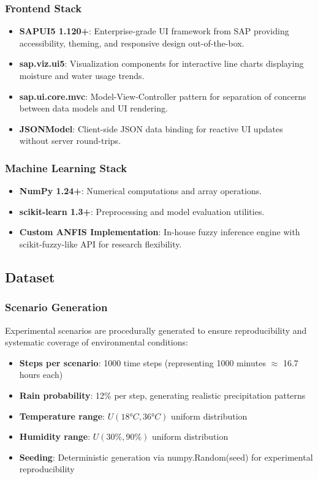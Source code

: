 \subsubsection{Frontend Stack}

\begin{itemize}
    \item \textbf{SAPUI5 1.120+}: Enterprise-grade UI framework from SAP providing accessibility, theming, and responsive design out-of-the-box.
    \item \textbf{sap.viz.ui5}: Visualization components for interactive line charts displaying moisture and water usage trends.
    \item \textbf{sap.ui.core.mvc}: Model-View-Controller pattern for separation of concerns between data models and UI rendering.
    \item \textbf{JSONModel}: Client-side JSON data binding for reactive UI updates without server round-trips.
\end{itemize}

\subsubsection{Machine Learning Stack}

\begin{itemize}
    \item \textbf{NumPy 1.24+}: Numerical computations and array operations.
    \item \textbf{scikit-learn 1.3+}: Preprocessing and model evaluation utilities.
    \item \textbf{Custom ANFIS Implementation}: In-house fuzzy inference engine with scikit-fuzzy-like API for research flexibility.
\end{itemize}

\subsection{Dataset}

\subsubsection{Scenario Generation}

Experimental scenarios are procedurally generated to ensure reproducibility and systematic coverage of environmental conditions:

\begin{itemize}
    \item \textbf{Steps per scenario}: 1000 time steps (representing 1000 minutes $\approx$ 16.7 hours each)
    \item \textbf{Rain probability}: 12\% per step, generating realistic precipitation patterns
    \item \textbf{Temperature range}: $U(18°C, 36°C)$ uniform distribution
    \item \textbf{Humidity range}: $U(30\%, 90\%)$ uniform distribution
    \item \textbf{Seeding}: Deterministic generation via numpy.Random(seed) for experimental reproducibility
\end{itemize}

